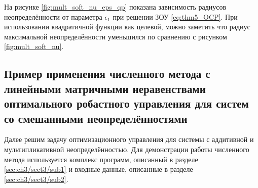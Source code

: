 На рисунке \ref{fig:mult_soft_nu_eps_qp} показана зависимость радиусов неопределённости от параметра $\epsilon_1$ при решении ЗОУ \eqref{eq:thm5_OCP}. При использовании квадратичной функции как целевой, можно заметить что радиус максимальной неопределённости уменьшился по сравнению с рисунком \ref{fig:mult_soft_nu}.

\subsection{Пример применения численного метода с линейными матричными неравенствами оптимального робастного управления для систем со смешанными неопределённостями}\label{sec:ch4/sect3/sub2}
Далее решим задачу оптимизационного управления для системы с аддитивной и мультипликативной неопределённостью. Для демонстрации работы численного метода используется комплекс программ, описанный в разделе \ref{sec:ch3/sect3/sub1} и входные данные, описанные в разделе \ref{sec:ch3/sect3/sub2}.

